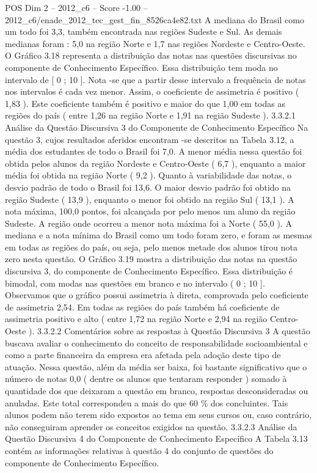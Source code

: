 \begin{textsample}{POS Dim 2 – 2012\_c6 – Score -1.00 – 2012\_c6/enade\_2012\_tec\_gest\_fin\_8526ca4e82.txt}
A mediana do Brasil como um todo foi 3,3, também encontrada nas regiões Sudeste e Sul.
As demais medianas foram : 5,0 na região Norte e 1,7 nas regiões Nordeste e Centro-Oeste.
O Gráfico 3.18 representa a distribuição das notas nas questões discursivas no componente de Conhecimento Específico.
Essa distribuição tem moda no intervalo de [ 0 ; 10 ].
Nota -se que a partir desse intervalo a frequência de notas nos intervalos é cada vez menor.
Assim, o coeficiente de assimetria é positivo ( 1,83 ).
Este coeficiente também é positivo e maior do que 1,00 em todas as regiões do país ( entre 1,26 na região Norte e 1,91 na região Sudeste ). 3.3.2.1 Análise da Questão Discursiva 3 do Componente de Conhecimento Específico Na questão 3, cujos resultados aferidos encontram -se descritos na Tabela 3.12, a média dos estudantes de todo o Brasil foi 7,0.
A menor média nessa questão foi obtida pelos alunos da região Nordeste e Centro-Oeste ( 6,7 ), enquanto a maior média foi obtida na região Norte ( 9,2 ).
Quanto à variabilidade das notas, o desvio padrão de todo o Brasil foi 13,6.
O maior desvio padrão foi obtido na região Sudeste ( 13,9 ), enquanto o menor foi obtido na região Sul ( 13,1 ).
A nota máxima, 100,0 pontos, foi alcançada por pelo menos um aluno da região Sudeste.
A região onde ocorreu a menor nota máxima foi a Norte ( 55,0 ).
A mediana e a nota mínima do Brasil como um todo foram zero, e foram as mesmas em todas as regiões do país, ou seja, pelo menos metade dos alunos tirou nota zero nesta questão.
O Gráfico 3.19 mostra a distribuição das notas na questão discursiva 3, do componente de Conhecimento Específico.
Essa distribuição é bimodal, com modas nas questões em branco e no intervalo ( 0 ; 10 ].
Observamos que o gráfico possui assimetria à direta, comprovada pelo coeficiente de assimetria 2,54.
Em todas as regiões do país também há coeficiente de assimetria positivo e alto ( entre 1,72 na região Norte e 2,94 na região Centro-Oeste ). 3.3.2.2 Comentários sobre as respostas à Questão Discursiva 3 A questão buscava avaliar o conhecimento do conceito de responsabilidade socioambiental e como a parte financeira da empresa era afetada pela adoção deste tipo de atuação.
Nessa questão, além da média ser baixa, foi bastante significativo que o número de notas 0,0 ( dentre os alunos que tentaram responder ) somado à quantidade dos que deixaram a questão em branco, respostas desconsideradas ou anuladas.
Este total correspondeu a mais do que 60 \% dos concluintes.
Tais alunos podem não terem sido expostos ao tema em seus cursos ou, caso contrário, não conseguiram aprender os conceitos exigidos na questão. 3.3.2.3 Análise da Questão Discursiva 4 do Componente de Conhecimento Específico A Tabela 3.13 contém as informações relativas à questão 4 do conjunto de questões do componente de Conhecimento Específico.

\end{textsample}

